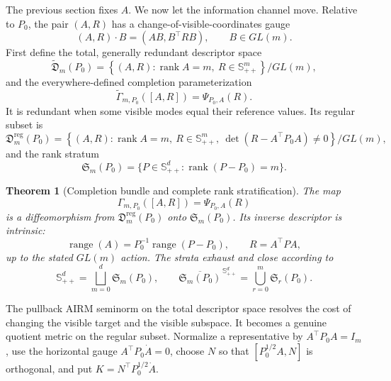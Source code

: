 \documentclass[10pt]{article}
\theoremstyle{plain}
\newtheorem{theorem}{Theorem}[section]
\theoremstyle{definition}
\theoremstyle{remark}
\newcommand{\SPD}{\mathbb S_{++}}
\newcommand{\rank}{\operatorname{rank}}
\newcommand{\range}{\operatorname{range}}
\begin{document}
The previous section fixes \(A\).  We now let the information channel move.
Relative to \(P_0\), the pair \((A,R)\) has a change-of-visible-coordinates
gauge
\[
  (A,R)\cdot B=(AB,B^\top RB),
  \qquad B\in GL(m).
\]
First define the total, generally redundant descriptor space
\begin{equation}
  \widetilde{\mathfrak D}_m(P_0)
  =
  \left\{(A,R):\rank A=m,\ R\in\SPD^m\right\}/GL(m),
  \label{eq:total-descriptor-space}
\end{equation}
and the everywhere-defined completion parameterization
\begin{equation}
  \widetilde\Gamma_{m,P_0}([A,R])=\Psi_{P_0,A}(R).
  \label{eq:total-completion-map}
\end{equation}
It is redundant when some visible modes equal their reference values.  Its
regular subset is
\begin{equation}
  \mathfrak D_m^{\mathrm{reg}}(P_0)
  =
  \left\{(A,R):\rank A=m,\ R\in\SPD^m,
  \ \det(R-A^\top P_0A)\ne0\right\}/GL(m),
  \label{eq:descriptor-space}
\end{equation}
and the rank stratum
\begin{equation}
  \mathfrak S_m(P_0)
  =\{P\in\SPD^d:\rank(P-P_0)=m\}.
  \label{eq:rank-stratum}
\end{equation}

\begin{theorem}[Completion bundle and complete rank stratification]
\label{thm:rank-stratification}
The map
\begin{equation}
  \Gamma_{m,P_0}([A,R])=\Psi_{P_0,A}(R)
  \label{eq:stratum-map}
\end{equation}
is a diffeomorphism from
\(\mathfrak D_m^{\mathrm{reg}}(P_0)\) onto
\(\mathfrak S_m(P_0)\).  Its inverse descriptor is intrinsic:
\begin{equation}
  \range(A)=P_0^{-1}\range(P-P_0),
  \qquad
  R=A^\top PA,
  \label{eq:intrinsic-descriptor}
\end{equation}
up to the stated \(GL(m)\) action.  The strata exhaust and close according to
\begin{equation}
  \SPD^d=\bigsqcup_{m=0}^d\mathfrak S_m(P_0),
  \qquad
  \overline{\mathfrak S_m(P_0)}^{\,\SPD^d}
  =\bigcup_{r=0}^m\mathfrak S_r(P_0).
  \label{eq:strata-closure}
\end{equation}
\end{theorem}

The pullback AIRM seminorm on the total descriptor space resolves the cost of
changing the visible target and the visible subspace.  It becomes a genuine
quotient metric on the regular subset.  Normalize a representative by
\(A^\top P_0A=I_m\), use
the horizontal gauge \(A^\top P_0\dot A=0\), choose \(N\) so that
\([P_0^{1/2}A,N]\) is orthogonal, and put
\(K=N^\top P_0^{1/2}\dot A\).
\end{document}
